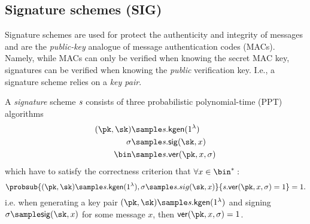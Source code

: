 \newpage
\subsection{Signature schemes (SIG)}
Signature schemes are used for protect the authenticity and integrity of messages and are the \emph{public-key} analogue of message authentication codes (MACs). Namely, while MACs can only be verified when knowing the secret MAC key, signatures can be verified when knowing the \emph{public} verification key. I.e., a signature scheme relies on a \emph{key pair}.

\begin{syntax}
  A \emph{signature} scheme $\mathit{{s}}$ consists of three probabilistic polynomial-time (PPT) algorithms
  \begin{align*}
    (\pk,\sk)\sample & \s.\kgen(1^\lambda)   \\
    \sigma\sample    & \s.\sig(\sk,x)        \\
    \bin \sample     & \s.\ver(\pk,x,\sigma)
  \end{align*}
  which have to satisfy the correctness criterion that $\forall x\in\bin^*:$
  \[\probsub{(\pk,\sk)\sample\s.\kgen(1^\lambda),\sigma\sample\s.sig(\sk,x)}{\s.\ver(\pk,x,\sigma)=1}=1.\]
  i.e. when generating a key pair $(\pk,\sk)\sample\s.\kgen(1^\lambda)$ and signing $\sigma\sample\sig(\sk,x)$ for some message $x$, then $\ver(\pk,x,\sigma)=1$.
\end{syntax}

